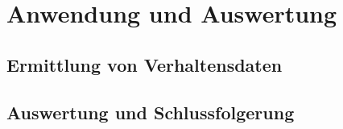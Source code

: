 \chapter{Anwendung und Auswertung}
\label{cha:auswertung}

\section{Ermittlung von Verhaltensdaten}
\label{sec:testing}

\section{Auswertung und Schlussfolgerung}
\label{sec:results}

